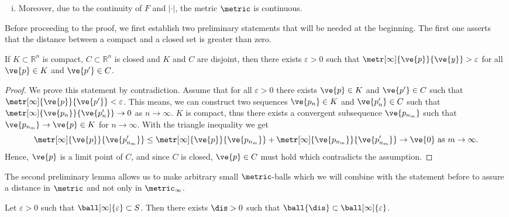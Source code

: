 \begin{rem}
\begin{enumerate}[(i)]
      $$\rho_i := \sup \left \{ |x_i - y_i| : (x_1, \dots, x_n), (y_1, \dots, y_n) \in S \right \} \in \mathbb{R}_{> 0} \cup \{\infty\}.$$
      Since $\metric$ is segmentally additive, every value between $0$ and $\rho_i$ must be in the domain of $\metric$. Since this is true for all $i$, this implies that $F$ is defined on a cartesian product of half-open, real intervals of the form $[0,\rho_i)$. \label{rem-lemma-domains}
		\item  Moreover, due to the continuity of $F$ and $| \cdot |$, the metric $\metric$ is continuous. \label{rem-lemma-continuity}
	\end{enumerate}
\end{rem}
Before proceeding to the proof, we first establish two preliminary statements that will be needed at the beginning.
The first one asserts that the distance between a compact and a closed set is greater than zero.

\begin{lem} \label{lemma-distance}
  If $K \subset \mathbb{R}^{n}$ is compact, $C \subset \mathbb{R}^{n}$ is closed and $K$ and $C$ are disjoint, then there exists $\varepsilon > 0$ such that $\metr[\infty]{\ve{p}}{\ve{y}} > \varepsilon$ for all $\ve{p} \in K$ and $\ve{p'} \in C$.
\end{lem}

\begin{proof}
	We prove this statement by contradiction.
  Assume that for all $\varepsilon > 0$ there exists $\ve{p} \in K$ and $\ve{p'} \in C$ such that $\metr[\infty]{\ve{p}}{\ve{p'}} < \varepsilon$. This means, we can construct two sequences $\ve{p_n} \in K$ and $\ve{p'_n} \in C$ such that $\metr[\infty]{\ve{p_n}}{\ve{p'_n}} \to 0$ as $n \to \infty$.
  $K$ is compact, thus there exists a convergent subsequence $\ve{p_{n_m}}$ such that $\ve{p_{n_m}} \to \ve{p} \in K$ for $n \rightarrow \infty$.
	With the triangle inequality we get
  $$\metr[\infty]{\ve{p}}{\ve{p'_{n_m}}} \leq \metr[\infty]{\ve{p}}{\ve{p_{n_m}}} + \metr[\infty]{\ve{p_{n_m}}}{\ve{p'_{n_m}}} \to \ve{0} \text{ as } m \to \infty.$$
  Hence,  $\ve{p}$ is a limit point of $C$, and since  $C$  is closed,  $\ve{p} \in C$ must hold which contradicts the assumption.
\end{proof}

The second preliminary lemma allows us to make arbitrary small $\metric$-balls which we will combine with the statement before to assure a distance in $\metric$ and not only in $\metric_{\infty}$.

\begin{lem} \label{lemma-small-delta-balls}
	Let $\varepsilon > 0$ such that $\ball[\infty]{\varepsilon} \subset S$. Then there exists $\dis > 0$ such that $\ball{\dis} \subset \ball[\infty]{\varepsilon}$.
\end{lem}

